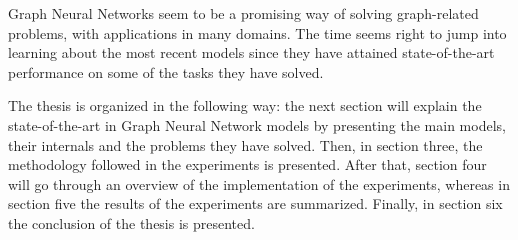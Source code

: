 Graph Neural Networks seem to be a promising way of solving graph-related problems, with applications in many domains. The time seems right to jump into learning about the most recent models since they have attained state-of-the-art performance on some of the tasks they have solved.



The thesis is organized in the following way: the next section will explain the state-of-the-art in Graph Neural Network models by presenting the main models, their internals and the problems they have solved. Then, in section three, the methodology followed in the experiments is presented. After that, section four will go through an overview of the implementation of the experiments, whereas in section five the results of the experiments are summarized. Finally, in section six the conclusion of the thesis is presented.